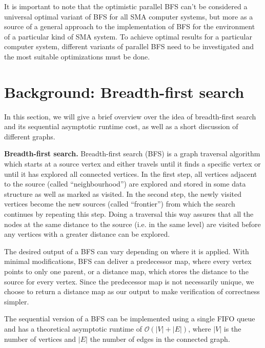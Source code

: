 \documentclass[letterpaper]{article}
\newcommand{\mypar}[1]{{\bf #1.}} %
\begin{document}
		It is important to note that the optimistic parallel BFS can't be considered a universal optimal variant of BFS for all SMA computer systems, but more as a source of a general approach to the implementation of BFS for the environment of a particular kind of SMA system.
		To achieve optimal results for a particular computer system, different variants of parallel BFS need to be investigated and the most suitable optimizations must be done.
	
	\section{Background: Breadth-first search}\label{sec:background} %
		
	In this section, we will give a brief overview over the idea of breadth-first search and its sequential asymptotic runtime cost, as well as a short discussion of different graphs. 
	
	
	\mypar{Breadth-first search}
	Breadth-first search (BFS) is a graph traversal algorithm which starts at a source vertex and either travels until it finds a specific vertex or until it has explored all connected vertices. 
	In the first step, all vertices adjacent to the source (called ``neighbourhood'') are explored and stored in some data structure as well as marked as visited. 
	In the second step, the newly visited vertices become the new sources (called ``frontier'') from which the search continues by repeating this step. 
	Doing a traversal this way assures that all the nodes at the same distance to the source (i.e. in the same level) are visited before any vertices with a greater distance can be explored. 
	
	The desired output of a BFS can vary depending on where it is applied. With minimal modifications, BFS can deliver a predecessor map, where every vertex points to only one parent, or a distance map, which stores the distance to the source for every vertex. Since the predecessor map is not necessarily unique, we choose to return a distance map as our output to make verification of correctness simpler.  
	
	The sequential version of a BFS can be implemented using a single FIFO queue and has a theoretical asymptotic runtime of $\mathcal{O}(\lvert V\rvert + \lvert E\rvert )$, where $\lvert V\rvert$ is the number of vertices and $\lvert E\rvert$ the number of edges in the connected graph.
	
\end{document}
